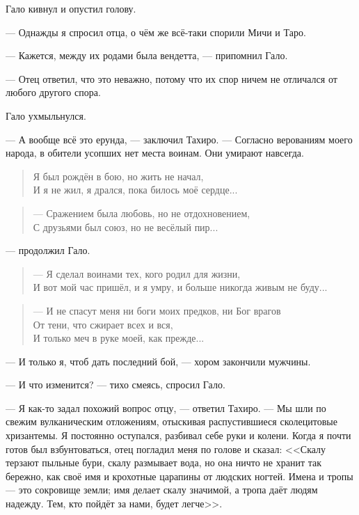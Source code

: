 Гало кивнул и опустил голову.

--- Однажды я спросил отца, о чём же всё-таки спорили Мичи и Таро.

--- Кажется, между их родами была вендетта, --- припомнил Гало.

--- Отец ответил, что это неважно, потому что их спор ничем не отличался от любого другого спора.

Гало ухмыльнулся.

--- А вообще всё это ерунда, --- заключил Тахиро.
--- Согласно верованиям моего народа, в обители усопших нет места воинам.
Они умирают навсегда.

\begin{verse}
Я был рождён в бою, но жить не начал,\\
И я не жил, я дрался, пока билось моё сердце...
\end{verse}

\begin{verse}
--- Сражением была любовь, но не отдохновением,\\
С друзьями был союз, но не весёлый пир...
\end{verse}

---  продолжил Гало.

\begin{verse}
--- Я сделал воинами тех, кого родил для жизни,\\
И вот мой час пришёл, и я умру, и больше никогда живым не буду...
\end{verse}

\begin{verse}
--- И не спасут меня ни боги моих предков, ни Бог врагов\\
От тени, что сжирает всех и вся,\\
И только меч в руке моей, как прежде...
\end{verse}

--- И только я, чтоб дать последний бой, --- хором закончили мужчины.

--- И что изменится? --- тихо смеясь, спросил Гало.

--- Я как-то задал похожий вопрос отцу, --- ответил Тахиро.
--- Мы шли по свежим вулканическим отложениям, отыскивая распустившиеся сколецитовые хризантемы.
Я постоянно оступался, разбивал себе руки и колени.
Когда я почти готов был взбунтоваться, отец погладил меня по голове и сказал:
<<Скалу терзают пыльные бури, скалу размывает вода, но она ничто не хранит так бережно, как своё имя и крохотные царапины от людских ногтей.
Имена и тропы --- это сокровище земли;
имя делает скалу значимой, а тропа даёт людям надежду.
Тем, кто пойдёт за нами, будет легче>>.

